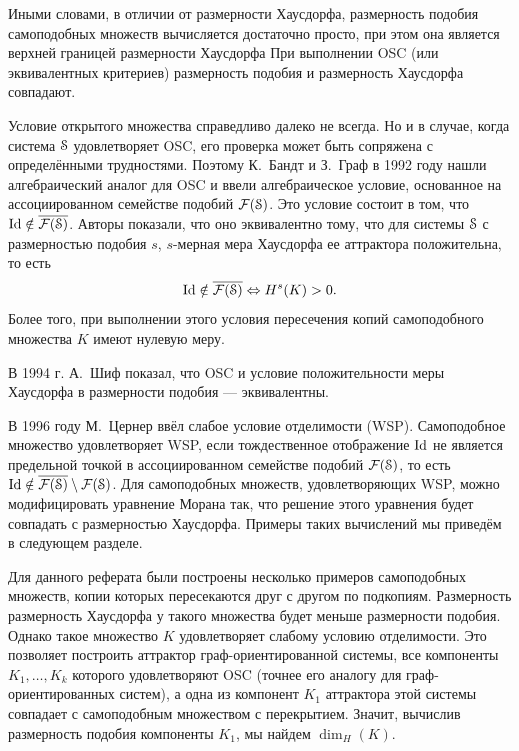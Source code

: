 \documentclass[a4paper,14pt]{extarticle} %
\newcommand{\eS}{\EuScript{S}}
\newcommand{\0}{\varnothing}
\newcommand{\8}{\infty}
\newcommand {\mmm} {\setminus}
\def \Id   {\mathop{\rm Id}   \nolimits}
\theoremstyle{definition}
\begin{document}
Иными словами, в отличии от размерности Хаусдорфа, размерность подобия самоподобных множеств вычисляется достаточно просто, при этом она является верхней границей размерности Хаусдорфа
При выполнении OSC (или эквивалентных критериев) размерность подобия и размерность Хаусдорфа совпадают.

Условие открытого множества справедливо далеко не всегда. 
Но и в случае, когда система $\eS$ удовлетворяет OSC, его проверка может быть сопряжена с определёнными трудностями.
Поэтому К.~Бандт и З.~Граф в 1992 году \cite{SSS7} нашли алгебраический аналог для OSC и ввели алгебраическое условие, основанное на ассоциированном семействе подобий $\mathcal{F}(\eS)$. 
Это условие состоит в том, что $\Id\notin\overline{\mathcal{F}(\eS)}$. 
Авторы показали, что оно эквивалентно тому, что для  системы $\eS$ с размерностью подобия $s$, $s$-мерная мера Хаусдорфа  ее аттрактора положительна, то есть
$$\Id\notin\overline{\mathcal{F}(\eS)} \Leftrightarrow H^s(K)>0.$$
Более того, при выполнении этого условия пересечения копий самоподобного множества $K$ имеют нулевую меру.

В 1994 г. А.~Шиф \cite{Schief1994} показал, что OSC и условие положительности меры Хаусдорфа в размерности подобия --- эквивалентны.

В 1996 году М.~Цернер \cite{Zerner1996} ввёл слабое условие отделимости (WSP).
Самоподобное множество удовлетворяет WSP, если тождественное отображение $\Id$ не является предельной точкой в ассоциированном семействе подобий $\mathcal{F}(\eS)$, то есть $\Id\notin\overline{\mathcal{F}(\eS)}\mmm\mathcal{F}(\eS)$.
Для самоподобных множеств, удовлетворяющих WSP, можно модифицировать уравнение Морана так, что решение этого уравнения будет совпадать с размерностью Хаусдорфа.
Примеры таких вычислений мы приведём в следующем разделе. 

Для данного реферата были построены несколько примеров самоподобных множеств, копии которых пересекаются друг с другом по подкопиям.
Размерность размерность Хаусдорфа у такого множества будет меньше размерности подобия.
Однако такое множество $K$ удовлетворяет слабому условию отделимости.
Это позволяет построить аттрактор граф-ориентированной системы, все компоненты $K_1,\ldots, K_k$ которого удовлетворяют OSC (точнее его аналогу для граф-ориентированных систем), а одна из компонент $K_1$ аттрактора этой системы совпадает с самоподобным множеством с перекрытием.
Значит, вычислив размерность подобия компоненты $K_1$, мы найдем $\dim_H(K)$.
\end{document}
